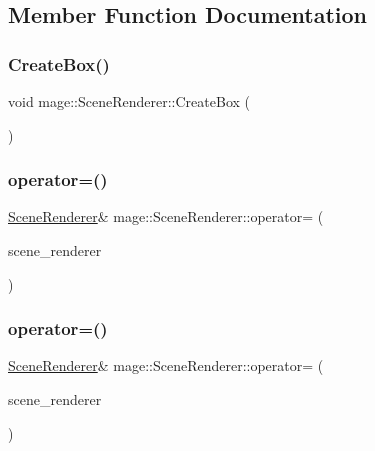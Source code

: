\subsection{Member Function Documentation}
\hypertarget{classmage_1_1_scene_renderer_a28c3d9c663d54e9a0f5867f3f8692655}{}\label{classmage_1_1_scene_renderer_a28c3d9c663d54e9a0f5867f3f8692655} 
\subsubsection{\texorpdfstring{Create\+Box()}{CreateBox()}}
{\footnotesize\ttfamily void mage\+::\+Scene\+Renderer\+::\+Create\+Box (\begin{DoxyParamCaption}{ }\end{DoxyParamCaption})\hspace{0.3cm}{\ttfamily [private]}}

\hypertarget{classmage_1_1_scene_renderer_a5b63908f5bdfe6128b43847db01db983}{}\label{classmage_1_1_scene_renderer_a5b63908f5bdfe6128b43847db01db983} 
\subsubsection{\texorpdfstring{operator=()}{operator=()}\hspace{0.1cm}{\footnotesize\ttfamily [1/2]}}
{\footnotesize\ttfamily \hyperlink{classmage_1_1_scene_renderer}{Scene\+Renderer}\& mage\+::\+Scene\+Renderer\+::operator= (\begin{DoxyParamCaption}\item[{const \hyperlink{classmage_1_1_scene_renderer}{Scene\+Renderer} \&}]{scene\+\_\+renderer }\end{DoxyParamCaption})\hspace{0.3cm}{\ttfamily [delete]}}

\hypertarget{classmage_1_1_scene_renderer_af64b01e57b0367a285f48e1f34f291e3}{}\label{classmage_1_1_scene_renderer_af64b01e57b0367a285f48e1f34f291e3} 
\subsubsection{\texorpdfstring{operator=()}{operator=()}\hspace{0.1cm}{\footnotesize\ttfamily [2/2]}}
{\footnotesize\ttfamily \hyperlink{classmage_1_1_scene_renderer}{Scene\+Renderer}\& mage\+::\+Scene\+Renderer\+::operator= (\begin{DoxyParamCaption}\item[{\hyperlink{classmage_1_1_scene_renderer}{Scene\+Renderer} \&\&}]{scene\+\_\+renderer }\end{DoxyParamCaption})\hspace{0.3cm}{\ttfamily [delete]}}

